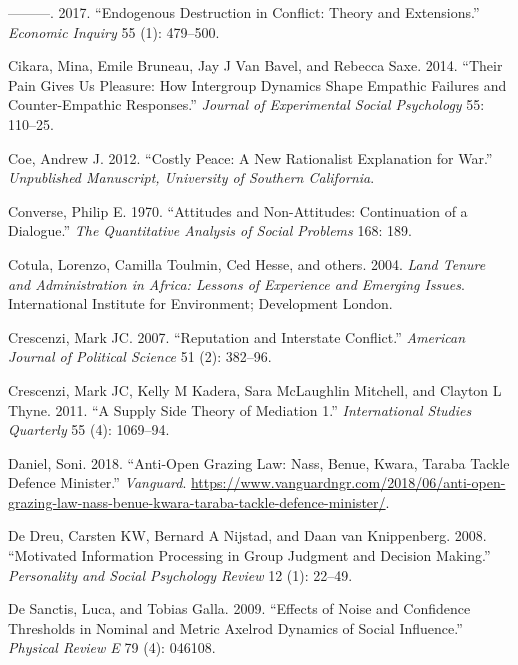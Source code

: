 \documentclass[11pt]{article}
\begin{document}
\leavevmode\hypertarget{ref-chang2017endogenous}{}%
---------. 2017. ``Endogenous Destruction in Conflict: Theory and
Extensions.'' \emph{Economic Inquiry} 55 (1): 479--500.

\leavevmode\hypertarget{ref-cikara2014their}{}%
Cikara, Mina, Emile Bruneau, Jay J Van Bavel, and Rebecca Saxe. 2014.
``Their Pain Gives Us Pleasure: How Intergroup Dynamics Shape Empathic
Failures and Counter-Empathic Responses.'' \emph{Journal of Experimental
Social Psychology} 55: 110--25.

\leavevmode\hypertarget{ref-coe2012costly}{}%
Coe, Andrew J. 2012. ``Costly Peace: A New Rationalist Explanation for
War.'' \emph{Unpublished Manuscript, University of Southern California}.

\leavevmode\hypertarget{ref-converse1970attitudes}{}%
Converse, Philip E. 1970. ``Attitudes and Non-Attitudes: Continuation of
a Dialogue.'' \emph{The Quantitative Analysis of Social Problems} 168:
189.

\leavevmode\hypertarget{ref-cotula2004land}{}%
Cotula, Lorenzo, Camilla Toulmin, Ced Hesse, and others. 2004.
\emph{Land Tenure and Administration in Africa: Lessons of Experience
and Emerging Issues}. International Institute for Environment;
Development London.

\leavevmode\hypertarget{ref-crescenzi2007reputation}{}%
Crescenzi, Mark JC. 2007. ``Reputation and Interstate Conflict.''
\emph{American Journal of Political Science} 51 (2): 382--96.

\leavevmode\hypertarget{ref-crescenzi2011supply}{}%
Crescenzi, Mark JC, Kelly M Kadera, Sara McLaughlin Mitchell, and
Clayton L Thyne. 2011. ``A Supply Side Theory of Mediation 1.''
\emph{International Studies Quarterly} 55 (4): 1069--94.

\leavevmode\hypertarget{ref-daniel2018anti}{}%
Daniel, Soni. 2018. ``Anti-Open Grazing Law: Nass, Benue, Kwara, Taraba
Tackle Defence Minister.'' \emph{Vanguard}.
\url{https://www.vanguardngr.com/2018/06/anti-open-grazing-law-nass-benue-kwara-taraba-tackle-defence-minister/}.

\leavevmode\hypertarget{ref-de2008motivated}{}%
De Dreu, Carsten KW, Bernard A Nijstad, and Daan van Knippenberg. 2008.
``Motivated Information Processing in Group Judgment and Decision
Making.'' \emph{Personality and Social Psychology Review} 12 (1):
22--49.

\leavevmode\hypertarget{ref-de2009effects}{}%
De Sanctis, Luca, and Tobias Galla. 2009. ``Effects of Noise and
Confidence Thresholds in Nominal and Metric Axelrod Dynamics of Social
Influence.'' \emph{Physical Review E} 79 (4): 046108.
\end{document}
